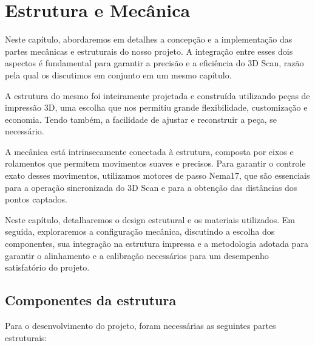 
\chapter{Estrutura e Mecânica}\label{cap:Mecânica}

Neste capítulo, abordaremos em detalhes a concepção e a implementação das partes mecânicas e estruturais do nosso projeto. A integração entre esses dois aspectos é fundamental para garantir a precisão e a eficiência do 3D Scan, razão pela qual os discutimos em conjunto em um mesmo capítulo.

A estrutura do mesmo foi inteiramente projetada e construída utilizando peças de impressão 3D, uma escolha que nos permitiu grande flexibilidade, customização e economia. Tendo também, a facilidade de ajustar e reconstruir a peça, se necessário.

A mecânica está intrinsecamente conectada à estrutura, composta por eixos e rolamentos que permitem movimentos suaves e precisos. Para garantir o controle exato desses movimentos, utilizamos motores de passo Nema17, que são essenciais para a operação sincronizada do 3D Scan e para a obtenção das distâncias dos pontos captados.

Neste capítulo, detalharemos o design estrutural e os materiais utilizados. Em seguida, exploraremos a configuração mecânica, discutindo a escolha dos componentes, sua integração na estrutura impressa e a metodologia adotada para garantir o alinhamento e a calibração necessários para um desempenho satisfatório do projeto.

\section{Componentes da estrutura}


Para o desenvolvimento do projeto, foram necessárias as seguintes partes estruturais:


